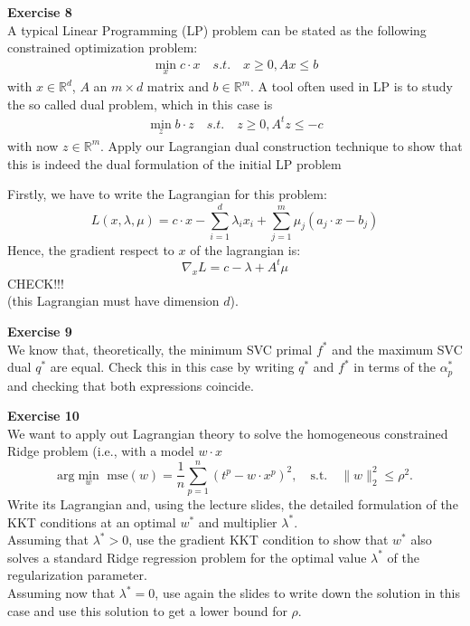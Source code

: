 \documentclass[11pt,table]{article}
\newenvironment{problem}[2][Exercise]
    { \begin{mdframed}[backgroundcolor=gray!20] \textbf{#1 #2} \\}
    {  \end{mdframed}}
\newcommand\norm[1]{\lVert#1\rVert}
\newcommand\R{\mathbb R}
\begin{document}
\begin{problem}{8}
A typical Linear Programming (LP) problem can be stated as the following constrained optimization problem:
\begin{align*}
  \min_x c \cdot x \quad s.t. \quad x \geq 0, Ax \leq b
\end{align*}
with \(x \in \R^d\), \(A\) an \(m \times d\) matrix and \(b \in \R^m\). A tool often used in LP is to study the so called dual problem, which in this case is
\begin{align*}
  \min_{z} b \cdot z \quad s.t. \quad z \geq 0, A^t z \leq -c
\end{align*}
with now \(z \in \R^m\). Apply our Lagrangian dual construction technique to show that this is indeed the dual formulation of the initial LP problem
\end{problem}

Firstly, we have to write the Lagrangian for this problem:
\[
  L(x,\lambda,\mu) = c \cdot x -  \sum_{i=1}^d \lambda_i x_i  + \sum_{j=1}^m \mu_j(a_j \cdot x - b_j)
\]
Hence, the gradient respect to \(x\) of the lagrangian is:
\[
  \nabla_x L = c - \lambda + A^t \mu
\]
CHECK!!!\\
(this Lagrangian must have dimension \(d\)).

\begin{problem}{9}
We know that, theoretically, the minimum SVC primal \(f^*\) and the maximum SVC dual \(q^*\) are equal. Check this in this case by writing \(q^*\) and \(f^*\) in terms of the \(\alpha_p^*\) and checking that both expressions coincide.
\end{problem}

\begin{problem}{10}
We want to apply out Lagrangian theory to solve the homogeneous constrained Ridge problem (i.e., with a model \(w\cdot x\)
\[
  \text{arg}\min_{w} \text{ mse}(w) = \frac{1}{n} \sum_{p=1}^n (t^p - w \cdot x^p)^2, \quad \text{s.t.} \quad \norm{w}_2^2 \leq \rho^2.
\]
Write its Lagrangian and, using the lecture slides, the detailed formulation of the KKT conditions at an optimal \(w^*\) and multiplier \(\lambda^*\).\\
Assuming that \(\lambda^* > 0\), use the gradient KKT condition to show that \(w^*\) also solves a standard Ridge regression problem for the optimal value \(\lambda^*\) of the regularization parameter.\\
Assuming now that \(\lambda^* = 0\), use again the slides to write down the solution in this case and use this solution to get a lower bound for \(\rho\).
\end{problem}
\end{document}
